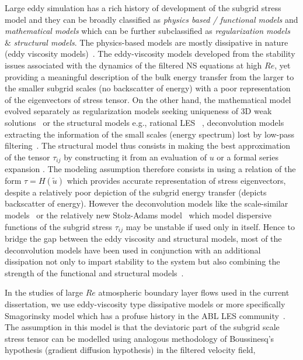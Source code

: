 Large eddy simulation has a rich history of development of the subgrid stress model and they can be broadly classified as \textit{physics based / functional models} and \textit{mathematical models} which can be further subclassified as \textit{regularization models} $\&$ \textit{structural models}. The physics-based models are mostly dissipative in nature (eddy viscosity models)~\cite{smagorinsky,deardoff,schumann,grot,mason,germano,lily,katz,porte1fun,bou1}. The eddy-viscosity models developed from the stability issues associated with the dynamics of the filtered NS equations at high $Re$, yet providing a meaningful description of the bulk energy transfer from the larger to the smaller subgrid scales (no backscatter of energy) with a poor representation of the eigenvectors of stress tensor. On the other hand, the mathematical model evolved separately as regularization models seeking uniqueness of 3D weak solutions~\cite{lad,lad2,holm,karmanos,guermond,guerts} or the structural models e.g., rational LES ~\cite{il1,il2}, deconvolution models extracting the information of the small scales (energy spectrum) lost by low-pass filtering~\cite{bardina2,bal3,stolz,lay2,dunca,sag,bers}. The structural model thus consists in making the best approximation of the tensor $\tau_{ij}$ by constructing it from an evaluation of $u$ or a formal series expansion . The modeling assumption therefore consists in using a relation of the form $\tau = H(\widetilde{u})$ which provides accurate representation of stress eigenvectors, despite a relatively poor depiction of the subgrid energy transfer (depicts backscatter of energy). However the deconvolution models like the scale-similar models~\cite{bardina2,lay2} or the relatively new Stolz-Adams model~\cite{stolz,dunca} which model dispersive functions of the subgrid stress $\tau_{ij}$ may be unstable if used only in itself. Hence to bridge the gap between the eddy viscosity and structural models, most of the deconvolution models have been used in conjunction  with an additional dissipation not only to impart stability to the system but also combining the strength of the functional and structural models~\cite{bardina,zhang}.\\
\par
In the studies of large $Re$ atmospheric boundary layer flows used in the current dissertation, we use eddy-viscosity type dissipative models or more specifically Smagorinsky model which has a profuse history in the ABL LES community~\cite{mason,sull,katz,porte1fun,bou1,brass,meyers2}. The assumption in this model is that the deviatoric part of the subgrid scale stress tensor can be modelled using analogous methodology of Boussinesq's hypothesis (gradient diffusion hypothesis) in the filtered velocity field,
